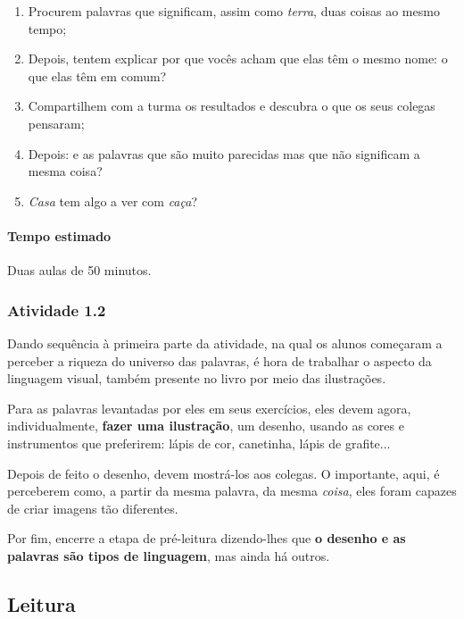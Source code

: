 \documentclass[11pt]{extarticle}
\begin{document}
\begin{enumerate}
\item Procurem palavras que significam, assim como \textit{terra}, 
duas coisas ao mesmo tempo;

\item Depois, tentem explicar por que vocês acham que elas têm o mesmo nome:
o que elas têm em comum?

\item Compartilhem com a turma os resultados e descubra o que os seus
colegas pensaram;

\item Depois: e as palavras que são muito parecidas mas 
que não significam a mesma coisa? 

\item \textit{Casa} tem algo a ver com \textit{caça}?
\end{enumerate}

\paragraph{Tempo estimado} Duas aulas de 50 minutos.



\subsubsection{Atividade 1.2}

Dando sequência à primeira parte da atividade, na qual os alunos
começaram a perceber a riqueza do universo das palavras, 
é hora de trabalhar o aspecto da linguagem visual, também 
presente no livro por meio das ilustrações. 

Para as palavras levantadas por eles em seus exercícios,
eles devem agora, individualmente, \textbf{fazer uma ilustração},
um desenho, usando as cores e instrumentos que preferirem: lápis de cor, 
canetinha, lápis de grafite... 

Depois de feito o desenho, devem mostrá-los aos colegas.
O importante, aqui, é perceberem como, a partir da mesma 
palavra, da mesma \textit{coisa}, eles foram capazes de criar 
imagens tão diferentes. 

Por fim, encerre a etapa de pré-leitura dizendo-lhes
que \textbf{o desenho e as palavras são tipos de linguagem},
mas ainda há outros.



\subsection{Leitura}
\end{document}
